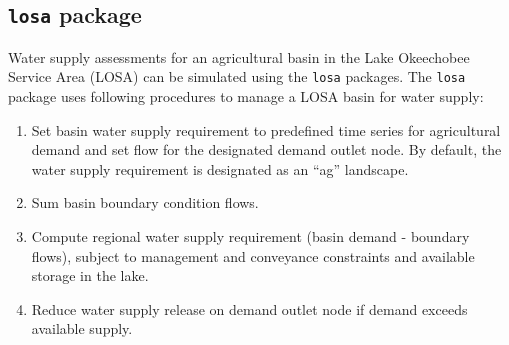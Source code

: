 \subsection{{\tt losa} package }

Water supply assessments for an agricultural basin in the Lake
Okeechobee Service Area (LOSA) can be simulated using the {\tt losa}
packages.  The {\tt losa} package uses following procedures to manage
a LOSA basin for water supply:

\begin{enumerate}

 \item Set basin water supply requirement to predefined time series
  for agricultural demand and set flow for the designated demand
  outlet node.  By default, the water supply requirement is designated
  as an ``ag'' landscape.

 \item Sum basin boundary condition flows.

 \item Compute regional water supply requirement (basin demand -
   boundary flows), subject to management and conveyance constraints
   and available storage in the lake.

 \item Reduce water supply release on demand outlet node if demand
   exceeds available supply.

\end{enumerate}

